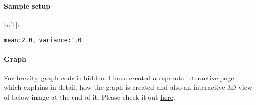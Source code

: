 \documentclass[float=false,crop=false]{standalone}
\begin{document}
\paragraph{Sample setup}\label{sample-setup}
\begin{InVerbatim}[commandchars=\\\{\},fontsize=\scriptsize]
{\color{incolor}In[{\color{incolor}1}]:}   \PY{p}{[}\PY{p}{]}   
          
          
          \PY{p}{[}      \PY{p}{]}
         
\end{InVerbatim}
    \begin{Verbatim}[commandchars=\\\{\},fontsize=\footnotesize]
mean:2.0, variance:1.0

    \end{Verbatim}

    \paragraph{Graph}\label{graph}

For brevity, graph code is hidden. I have created a separate interactive
page which explains in detail, how the graph is created and also an
interactive 3D view of below image at the end of it. Please check it out
\href{http://nbviewer.jupyter.org/gist/parthi2929/96f5ad7b30a8588ee2920fed594a7172}{here}.
    
\end{document}
